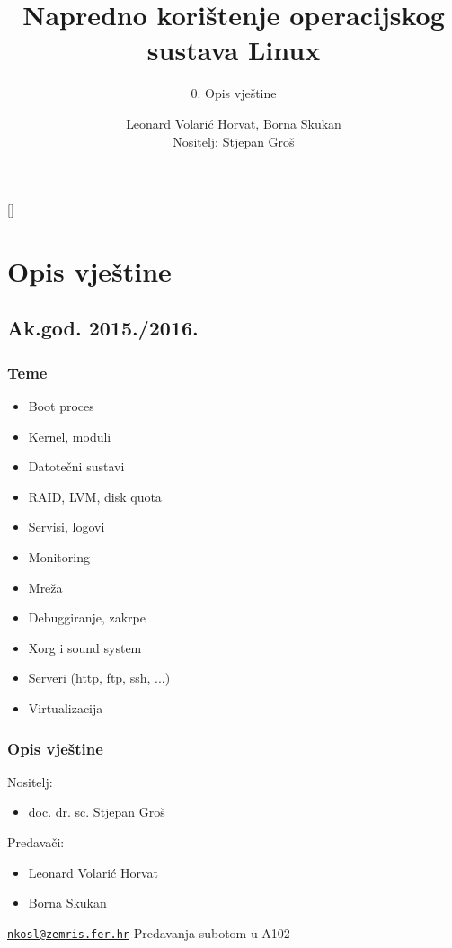 \documentclass[t]{beamer}
\date{}
\title[NKOSL]{Napredno korištenje operacijskog sustava Linux}
\author[]{Leonard Volarić Horvat, Borna Skukan\\{\small Nositelj: Stjepan Groš}}
\subtitle{0. Opis vještine}
\institute[]{Sveučilište u Zagrebu\\Fakultet elektrotehnike i računarstva}
\begin{document}
{
	\begin{frame}
		\maketitle
	\end{frame}
}

\section{Opis vještine}
\subsection{Ak.god. 2015./2016.}

\begin{frame}
	\frametitle{Teme}
	\begin{itemize}
		\item Boot proces
		\item Kernel, moduli
		\item Datotečni sustavi
		\item RAID, LVM, disk quota
		\item Servisi, logovi
		\item Monitoring
		\item Mreža
		\item Debuggiranje, zakrpe
		\item Xorg i sound system
		\item Serveri (http, ftp, ssh, ...)
		\item Virtualizacija
	\end{itemize}
\end{frame}

\begin{frame}
	\frametitle{Opis vještine}
	Nositelj:
	\begin{itemize}
		\item[] doc. dr. sc. Stjepan Groš
	\end{itemize}
	Predavači:
	\begin{itemize}
		\item Leonard Volarić Horvat
		\item Borna Skukan
	\end{itemize}
	\vfill
	\href{mailto:nkosl@zemris.fer.hr}{\nolinkurl{nkosl@zemris.fer.hr}}
	\vfill
	Predavanja subotom u A102
\end{frame}
\end{document}
